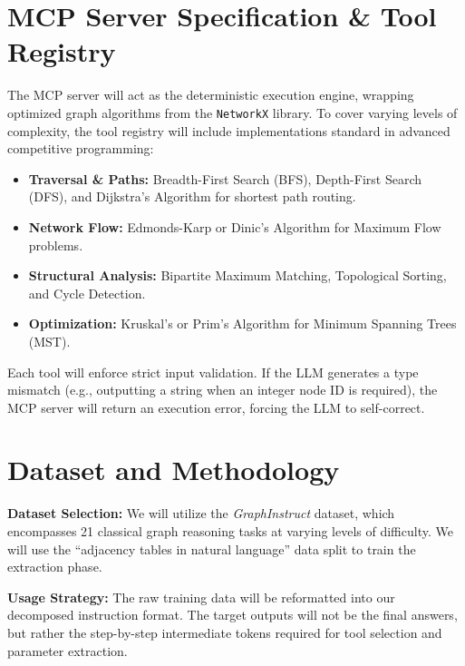 \documentclass[sigconf, nonacm]{acmart}
\begin{document}
\section{MCP Server Specification \& Tool Registry}
The MCP server will act as the deterministic execution engine, wrapping optimized graph algorithms from the \texttt{NetworkX} library. To cover varying levels of complexity, the tool registry will include implementations standard in advanced competitive programming:
\begin{itemize}
    \item \textbf{Traversal \& Paths:} Breadth-First Search (BFS), Depth-First Search (DFS), and Dijkstra’s Algorithm for shortest path routing.
    \item \textbf{Network Flow:} Edmonds-Karp or Dinic's Algorithm for Maximum Flow problems.
    \item \textbf{Structural Analysis:} Bipartite Maximum Matching, Topological Sorting, and Cycle Detection.
    \item \textbf{Optimization:} Kruskal’s or Prim’s Algorithm for Minimum Spanning Trees (MST).
\end{itemize}
Each tool will enforce strict input validation. If the LLM generates a type mismatch (e.g., outputting a string when an integer node ID is required), the MCP server will return an execution error, forcing the LLM to self-correct.

\section{Dataset and Methodology}
\textbf{Dataset Selection:} We will utilize the \textit{GraphInstruct} dataset, which encompasses 21 classical graph reasoning tasks at varying levels of difficulty. We will use the ``adjacency tables in natural language'' data split to train the extraction phase.

\noindent \textbf{Usage Strategy:} The raw training data will be reformatted into our decomposed instruction format. The target outputs will not be the final answers, but rather the step-by-step intermediate tokens required for tool selection and parameter extraction. 
\end{document}

